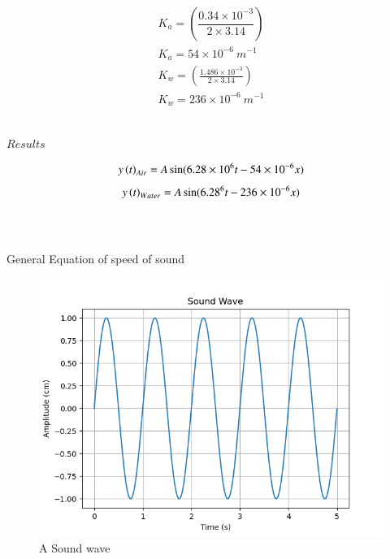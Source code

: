 \documentclass[journal,12pt,twocolumn]{IEEEtran}
\theoremstyle{remark}
\begin{document}
\begin{enumerate}
\begin{align}
    K_a=\left(\dfrac{0.34\times 10^{-3}}{2 \times 3.14 }\right)\\
    K_a=54 \times 10^{-6} \: m^{-1}
\end{align}
\begin{align}
    K_w= \left(\frac{1.486 \times 10^{-3}}{2 \times 3.14}\right)\\
    K_w=236 \times 10^{-6} \: m^{-1}
\end{align}\\
\setlength{\intextsep}{2pt}
\begin{table}[h!]
\centering

\vspace{0.5cm}
\caption{\normalsize $Results$}
\label{tab:parameters}
\end{table}
\begin{align}
    y \left(t\right)_{Air}=A \sin (6.28 \times 10^{6} t-54\times 10^{-6}x)
\end{align}
\begin{align}
    y \brak{t}_{Water}=A \sin (6.28 \time 10^{6}t - 236 \times 10^{-6}x)
\end{align}\\
\\

\end{enumerate}


\begin{table}[h!]
\centering

\vspace{0.5cm}
\caption{\normalsize General Equation of speed of sound}
\label{tab:General Equation of speed of sound}
\end{table}



\begin{figure}[h]
    \centering

\includegraphics[width=\columnwidth]{graph.png}

\begin{center}
    \caption{A Sound wave}
\end{center}
    
    \label{fig:Sound Wave}
\end{figure}
\end{document}
